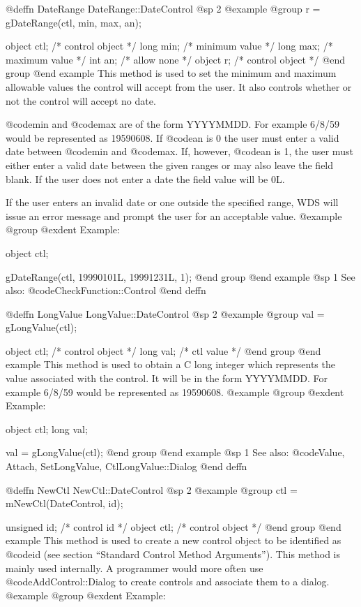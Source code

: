 @deffn {DateRange} DateRange::DateControl
@sp 2
@example
@group
r = gDateRange(ctl, min, max, an);

object  ctl;   /*  control object  */
long    min;   /*  minimum value   */
long    max;   /*  maximum value   */
int     an;    /*  allow none      */
object  r;     /*  control object  */
@end group
@end example
This method is used to set the minimum and maximum allowable values
the control will accept from the user.  It also controls whether
or not the control will accept no date.

@code{min} and @code{max} are of the form YYYYMMDD.  For example
6/8/59 would be represented as 19590608.  If @code{an} is 0
the user must enter a valid date between @code{min} and @code{max}.
If, however, @code{an} is 1, the user must either enter a valid
date between the given ranges or may also leave the field blank.
If the user does not enter a date the field value will be 0L.

If the user enters an invalid date or one outside the specified range,
WDS will issue an error message and prompt the user for an acceptable
value.
@example
@group
@exdent Example:

object  ctl;

gDateRange(ctl, 19990101L, 19991231L, 1);
@end group
@end example
@sp 1
See also:  @code{CheckFunction::Control}
@end deffn








@deffn {LongValue} LongValue::DateControl
@sp 2
@example
@group
val = gLongValue(ctl);

object  ctl;   /*  control object  */
long    val;   /*  ctl value       */
@end group
@end example
This method is used to obtain a C long integer which represents the
value associated with the control.  It will be in the form YYYYMMDD.
For example 6/8/59 would be represented as 19590608.
@example
@group
@exdent Example:

object  ctl;
long    val;

val = gLongValue(ctl);
@end group
@end example
@sp 1
See also:  @code{Value, Attach, SetLongValue, CtlLongValue::Dialog}
@end deffn










@deffn {NewCtl} NewCtl::DateControl
@sp 2
@example
@group
ctl = mNewCtl(DateControl, id);

unsigned  id;   /*  control id      */
object   ctl;   /*  control object  */
@end group
@end example
This method is used to create a new control object to be identified as
@code{id} (see section ``Standard Control Method Arguments'').  This
method is mainly used internally.  A programmer would more often
use @code{AddControl::Dialog} to create controls and associate them
to a dialog.
@example
@group
@exdent Example:

